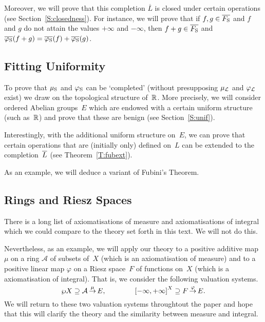 \documentclass[main.tex]{subfiles}
\begin{document}
Moreover,
we will prove that this completion $\overline L$
is closed under certain operations (see Section~\ref{S:closedness}).
For instance,
we will prove that if $f,g\in \overline{F_{\mathrm{S}}}$
and $f$ and $g$ do not attain the values $+\infty$ and $-\infty$,
then $f+g\in\overline{F_{\mathrm{S}}}$ and 
$\overline{\varphi_{\mathrm{S}}}(f+g)=\overline{\varphi_{\mathrm{S}}}(f) + \overline{\varphi_{\mathrm{S}}}(g)$.

\subsection{Fitting Uniformity}
To prove that $\mu_{\mathrm{S}}$ and $\varphi_{\mathrm{S}}$
can be `completed'
(without presupposing $\mu_{\mathcal{L}}$ and $\varphi_{\mathcal{L}}$ exist)
we draw on the topological structure of~$\mathbb{R}$.
More precisely,
we will consider ordered Abelian groups~$E$
which are endowed with a certain uniform structure
(such as~$\mathbb{R}$) and prove
that these are benign (see Section~\ref{S:unif}).

Interestingly,
with the additional uniform structure on~$E$,
we can prove that certain operations
that are (initially only) defined on~$L$
can be extended to the completion~$\overline{L}$
(see Theorem~\ref{T:fubext}).

As an example,
we will deduce a variant of Fubini's Theorem.

\subsection{Rings and Riesz Spaces}
There is a long list of axiomatisations of measure and
axiomatisations of integral
which we could compare to the theory set forth in this text.
We will not do this.

Nevertheless,
as an example,
we will apply our theory
to a positive additive map $\mu$ on a ring $\mathcal{A}$ of
subsets of~$X$
(which is an axiomatisation of measure)
and 
to a positive linear 
map $\varphi$ on a Riesz space~$F$ of functions on~$X$
(which is a axiomatisation of integral).
That is,
we consider the following valuation systems.
\begin{equation*}
\wp X \supseteq \mathcal{A}\,\smash{\stackrel{\mu}{\rightarrow}}\,E,
\qquad\qquad
\smash{{[-\infty,+\infty]}^X} \supseteq F\,\smash{\stackrel{\varphi}{\rightarrow}}\,E.
\end{equation*}
We will return to these two valuation systems throughtout the paper
and hope that this will clarify the theory
and the similarity between measure and integral.
\end{document}

